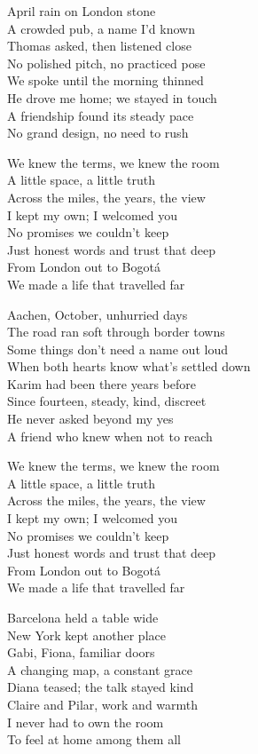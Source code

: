 \begin{lyrics}
April rain on London stone\\
A crowded pub, a name I’d known\\
Thomas asked, then listened close\\
No polished pitch, no practiced pose\\
We spoke until the morning thinned\\
He drove me home; we stayed in touch\\
A friendship found its steady pace\\
No grand design, no need to rush

We knew the terms, we knew the room\\
A little space, a little truth\\
Across the miles, the years, the view\\
I kept my own; I welcomed you\\
No promises we couldn’t keep\\
Just honest words and trust that deep\\
From London out to Bogotá\\
We made a life that travelled far

Aachen, October, unhurried days\\
The road ran soft through border towns\\
Some things don’t need a name out loud\\
When both hearts know what’s settled down\\
Karim had been there years before\\
Since fourteen, steady, kind, discreet\\
He never asked beyond my yes\\
A friend who knew when not to reach

We knew the terms, we knew the room\\
A little space, a little truth\\
Across the miles, the years, the view\\
I kept my own; I welcomed you\\
No promises we couldn’t keep\\
Just honest words and trust that deep\\
From London out to Bogotá\\
We made a life that travelled far

Barcelona held a table wide\\
New York kept another place\\
Gabi, Fiona, familiar doors\\
A changing map, a constant grace\\
Diana teased; the talk stayed kind\\
Claire and Pilar, work and warmth\\
I never had to own the room\\
To feel at home among them all


\end{lyrics}
